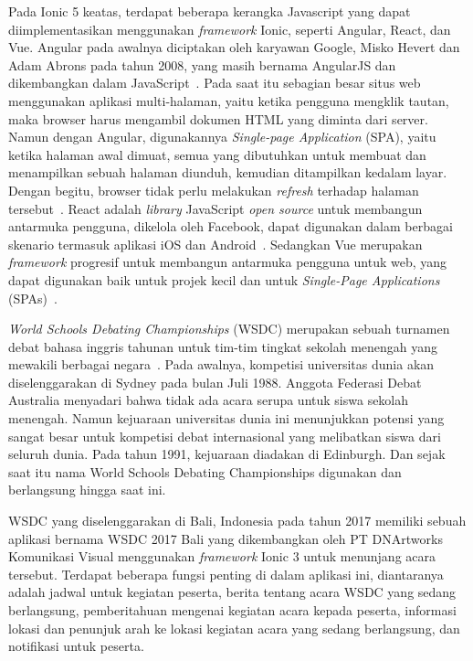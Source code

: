 Pada Ionic 5 keatas, terdapat beberapa kerangka Javascript yang dapat diimplementasikan menggunakan \textit{framework} Ionic, seperti Angular, React, dan Vue. Angular pada awalnya diciptakan oleh karyawan Google, Misko Hevert dan Adam Abrons pada tahun 2008, yang masih bernama AngularJS dan dikembangkan dalam JavaScript~\cite{wohlgethan:18:supporting}. Pada saat itu sebagian besar situs web menggunakan aplikasi multi-halaman, yaitu ketika pengguna mengklik tautan, maka browser harus mengambil dokumen HTML yang diminta dari server. Namun dengan Angular, digunakannya \textit{Single-page Application} (SPA), yaitu ketika halaman awal dimuat, semua yang dibutuhkan untuk membuat dan menampilkan sebuah halaman diunduh, kemudian ditampilkan kedalam layar. Dengan begitu, browser tidak perlu melakukan \textit{refresh} terhadap halaman tersebut~\cite{scott:15:spa}. React adalah \textit{library} JavaScript {\it open source} untuk membangun antarmuka pengguna, dikelola oleh Facebook, dapat digunakan dalam berbagai skenario termasuk aplikasi iOS dan Android~\cite{wohlgethan:18:supporting}. Sedangkan Vue merupakan \textit{framework}  progresif untuk membangun antarmuka pengguna untuk web, yang dapat digunakan baik untuk projek kecil dan untuk {\it Single-Page Applications} (SPAs)~\cite{wohlgethan:18:supporting}.

\textit{World Schools Debating Championships} (WSDC) merupakan sebuah turnamen debat bahasa inggris tahunan untuk tim-tim tingkat sekolah menengah yang mewakili berbagai negara~\cite{wsdc}. Pada awalnya, kompetisi universitas dunia akan diselenggarakan di Sydney pada bulan Juli 1988. Anggota Federasi Debat Australia menyadari bahwa tidak ada acara serupa untuk siswa sekolah menengah. Namun kejuaraan universitas dunia ini menunjukkan potensi yang sangat besar untuk kompetisi debat internasional yang melibatkan siswa dari seluruh dunia. Pada tahun 1991, kejuaraan diadakan di Edinburgh. Dan sejak saat itu nama World Schools Debating Championships digunakan dan berlangsung hingga saat ini. 

WSDC yang diselenggarakan di Bali, Indonesia pada tahun 2017 memiliki sebuah aplikasi bernama WSDC 2017 Bali yang dikembangkan oleh PT DNArtworks Komunikasi Visual menggunakan \textit{framework} Ionic 3 untuk menunjang acara tersebut. Terdapat beberapa fungsi penting di dalam aplikasi ini, diantaranya adalah jadwal untuk kegiatan peserta, berita tentang acara WSDC yang sedang berlangsung, pemberitahuan mengenai kegiatan acara kepada peserta, informasi lokasi dan penunjuk arah ke lokasi kegiatan acara yang sedang berlangsung, dan notifikasi untuk peserta. 

